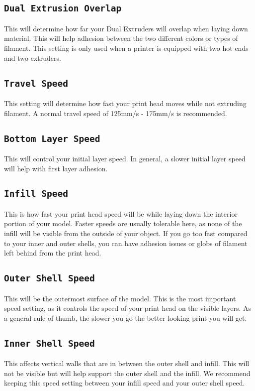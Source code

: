 \subsection{\texttt{Dual Extrusion Overlap}}
This will determine how far your Dual Extruders will overlap when laying down material. This will help adhesion between the two different colors or types of filament. This setting is only used when a printer is equipped with two hot ends and two extruders.

\subsection{\texttt{Travel Speed}}
This setting will determine how fast your print head moves while not extruding filament. A normal travel speed of 125mm/s - 175mm/s is recommended.

\subsection{\texttt{Bottom Layer Speed}}
This will control your initial layer speed. In general, a slower initial layer speed will help with first layer adhesion. 

\subsection{\texttt{Infill Speed}}
This is how fast your print head speed will be while laying down the interior portion of your model. Faster speeds are usually tolerable here, as none of the infill will be visible from the outside of your object. If you go too fast compared to your inner and outer shells, you can have adhesion issues or globs of filament left behind from the print head.

\subsection{\texttt{Outer Shell Speed}}
This will be the outermost surface of the model. This is the most important speed setting, as it controls the speed of your print head on the visible layers. As a general rule of thumb, the slower you go the better looking print you will get. 

\subsection{\texttt{Inner Shell Speed}}
This affects vertical walls that are in between the outer shell and infill. This will not be visible but will help support the outer shell and the infill. We recommend keeping this speed setting between your infill speed and your outer shell speed.

